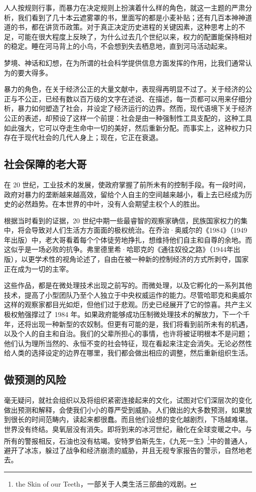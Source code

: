 人人按规则行事，而暴力在决定规则上扮演着什么样的角色，就这一主题的严肃分析，我们看到了几十本云遮雾罩的书，里面写的都是小麦补贴；还有几百本神神道道的书，都在讲货币政策。对于真正决定历史进程的关键因素，这种思考上的不足，可能在很大程度上反映了，为什么过去几个世纪以来，权力的配置能保持相对的稳定。睡在河马背上的小鸟，不会想到失去栖息地，直到河马活动起来。


梦境、神话和幻想，在为所谓的社会科学提供信息方面发挥的作用，比我们通常认为的要大得多。

暴力的角色，在关于经济公正的大量文献中，表现得再明显不过了。关于经济的公正与不公正，已经有数以百万级的文字在述说、在描述，每一页都可以用来仔细分析，暴力如何塑造了社会，并设定了经济运行的边界。然而，现代语境下关于经济公正的表述，却预设了这样一个前提：社会是由一种强制性工具支配的，这种工具如此强大，它可以夺走生命中一切的美好，然后重新分配。而事实上，这种权力只存在于现代社会的几代人身上；现在，它正在衰退。


\subsection{社会保障的老大哥}
在 20 世纪，工业技术的发展，使政府掌握了前所未有的控制手段。有一段时间，政府对暴力的垄断越来越高效，留给个人自主的空间越来越小，看上去已经成为历史的必然趋势。在本世界的中叶，没有人会期望主权个人的胜出。

根据当时看到的证据，20 世纪中期一些最睿智的观察家确信，民族国家权力的集中，将会导致对人们生活方方面面的极权统治。在乔治·奥威尔的《1984》（1949年出版）中，老大哥看着每个个体徒劳地挣扎，想维持他们自主和自尊的余地。而这似乎是一场必败的抗争。弗里德里希·哈耶克的《通往奴役之路》（1944年出版），以更学术性的视角论述了，自由在被一种新的控制经济的方式所剥夺，国家正在成为一切的主宰。


这些作品，都是在微处理技术出现之前写的。而微处理，以及它孵化的一系列其他技术，提高了小型团队乃至个人独立于中央权威运作的能力。尽管哈耶克和奥威尔这样的观察家都目光如炬，但他们过于悲观。历史已经展开了它的惊喜。共产主义极权勉强撑过了 1984 年。如果政府能够成功压制微处理技术的解放力，下一个千年，还将出现一种新型的农奴制。但更有可能的是，我们将看到前所未有的机遇，以及个人的自主和自治。我们的父辈所担心的事情，也许将被证明根本不是问题；他们认为理所当然的、永恒不变的社会特征，现在看起来注定会消失。无论必然性给人类的选择设定的边界在哪里，我们都会做出相应的调整，然后重新组织生活。


\subsection{做预测的风险}
毫无疑问，就社会组织以及将组织紧密连接起来的文化，试图对它们深层次的变化做出预测和解释，会使我们小小的尊严受到威胁。人们做出的大多数预测，如果放到很长的时间范畴内，读起来都很蠢。而且他们设想的变化越剧烈，下场越难堪。世界没有终结。臭氧层没有消失。即将到来的冰河世纪，融化在全球变暖之中。与所有的警报相反，石油也没有枯竭。安特罗伯斯先生，《九死一生》\footnote{the Skin of our Teeth，一部关于人类生活三部曲的戏剧。}中的普通人，避开了冰冻，躲过了战争和经济崩溃的威胁，并且无视专家报告的警示，自然地老去。


